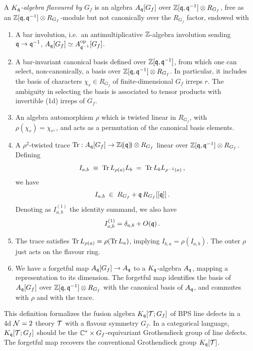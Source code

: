 \documentclass[12pt]{amsart}
\begin{document}
\begin{definition} \label{def:kq-flavoured}
A \emph{$K_{\mathfrak{q}}$-algebra flavoured by $G_f$} is an algebra $A_{\mathfrak{q}}[G_f]$ over $\mathbb{Z}[\mathfrak{q}, \mathfrak{q}^{-1}] \otimes R_{G_f}$, free
as an $\mathbb{Z}[\mathfrak{q}, \mathfrak{q}^{-1}]\otimes R_{G_f}$-module but not canonically over the $R_{G_f}$ factor, endowed with 
\begin{enumerate}[label=(F\arabic*), ref=F\arabic*, leftmargin=*, itemsep=5pt]
  \item\label{ax:f-bar}
    A bar involution, i.e.\ an antimultiplicative $\mathbb{Z}$-algebra involution
    sending $\mathfrak{q} \to \mathfrak{q}^{-1}$, $A_{\mathfrak{q}}[G_f] \simeq A^{\mathrm{op}}_{\mathfrak{q}^{-1}}[G_f]$.
  \item\label{ax:f-basis}
    A bar-invariant canonical basis defined over $\mathbb{Z}[\mathfrak{q}, \mathfrak{q}^{-1}]$, from which one can select, non-canonically, a basis over $\mathbb{Z}[\mathfrak{q}, \mathfrak{q}^{-1}] \otimes R_{G_f}$. In particular, it includes the basis of characters $\chi_r \in R_{G_f}$ of finite-dimensional $G_f$ irreps $r$. The ambiguity in selecting the basis is associated to tensor products with invertible (1d) irreps of $G_f$. 
  \item\label{ax:f-rho}
    An algebra automorphism $\rho$ which is twisted linear in $R_{G_f}$, with
    $\rho(\chi_r) = \chi_{r^\vee}$, and acts as a permutation of the canonical basis elements.
  \item\label{ax:f-trace}
    A $\rho^2$-twisted trace $\operatorname{Tr} : A_{\mathfrak{q}}[G_f] \to \mathbb{Z}(\!(\mathfrak{q})\!) \otimes R_{G_f}$
    linear over $\mathbb{Z}[\mathfrak{q}, \mathfrak{q}^{-1}] \otimes R_{G_f}$.  Defining 
    \begin{equation}\label{eq:f-index}
      I_{a,b} \;\equiv\; \operatorname{Tr} L_{\rho(a)} L_b \;=\; \operatorname{Tr} L_{b} L_{\rho^{-1}(a)} \,,
    \end{equation}
    we have
    \begin{equation}\label{eq:f-integrality}
      I_{a,b} \;\in\; R_{G_f} + \mathfrak{q}\, R_{G_f}[[\mathfrak{q}]] \,.
    \end{equation}
    Denoting as $I^{(1)}_{a,b}$ the identity summand, we also have
    \begin{equation}\label{eq:f-orthonormality}
      I^{(1)}_{a,b} = \delta_{a,b} + O(\mathfrak{q})\,.
    \end{equation}
     \item\label{ax:frhotr}
   The trace satisfies $\operatorname{Tr} L_{\rho(a)} = \rho(\operatorname{Tr} L_a)$, implying $I_{b,a} = \rho(I_{a,b})$. The outer $\rho$ just acts on the flavour ring. 
  \item\label{ax:f-forget}
    We have a forgetful map $A_{\mathfrak{q}}[G_f] \to A_{\mathfrak{q}}$ to a $K_{\mathfrak{q}}$-algebra $A_{\mathfrak{q}}$, mapping a representation to its dimension. The forgetful map identifies the basis of $A_{\mathfrak{q}}[G_f]$ over $\mathbb{Z}[\mathfrak{q}, \mathfrak{q}^{-1}] \otimes R_{G_f}$ with the canonical basis of $A_{\mathfrak{q}}$, and commutes with $\rho$ and with the trace.
\end{enumerate}
\end{definition}
This definition formalizes the fusion algebra $K_{\mathfrak{q}}[{\mathcal T};G_f]$ of BPS line defects in a 4d ${\cal N}=2$ theory ${\mathcal T}$ with a flavour symmetry $G_f$. In a categorical language, $K_{\mathfrak{q}}[{\mathcal T};G_f]$ should be the $\mathbb{C}^* \times G_f$-equivariant Grothendieck group of line defects. The forgetful map 
recovers the conventional Grothendieck group $K_{\mathfrak{q}}[{\mathcal T}]$. 
\end{document}
